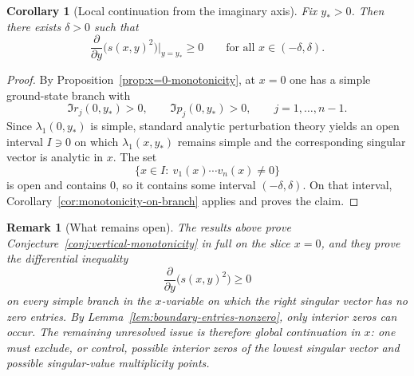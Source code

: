 \documentclass[11pt]{article}
\newtheorem{corollary}[theorem]{Corollary}
\newtheorem{remark}[theorem]{Remark}
\begin{document}
\begin{corollary}[Local continuation from the imaginary axis]\label{cor:local-continuation-from-x0}
Fix \(y_*>0\). Then there exists \(\delta>0\) such that
\[
\frac{\partial}{\partial y}\bigl(s(x,y)^2\bigr)\Big|_{y=y_*}\ge 0
\qquad
\text{for all }x\in(-\delta,\delta).
\]
\end{corollary}

\begin{proof}
By Proposition~\ref{prop:x=0-monotonicity}, at \(x=0\) one has a simple ground-state branch with
\[
\Im r_j(0,y_*)>0,
\qquad
\Im p_j(0,y_*)>0,
\qquad
j=1,\dots,n-1.
\]
Since \(\lambda_1(0,y_*)\) is simple, standard analytic perturbation theory yields an open interval \(I\ni 0\) on which \(\lambda_1(x,y_*)\) remains simple and the corresponding singular vector is analytic in \(x\). The set
\[
\{x\in I:\ v_1(x)\cdots v_n(x)\neq 0\}
\]
is open and contains \(0\), so it contains some interval \((-\delta,\delta)\). On that interval, Corollary~\ref{cor:monotonicity-on-branch} applies and proves the claim.
\end{proof}

\begin{remark}[What remains open]\label{rem:remaining-gap-monotonicity}
The results above prove Conjecture~\ref{conj:vertical-monotonicity} in full on the slice \(x=0\), and they prove the differential inequality
\[
\frac{\partial}{\partial y}\bigl(s(x,y)^2\bigr)\ge 0
\]
on every simple branch in the \(x\)-variable on which the right singular vector has no zero entries. By Lemma~\ref{lem:boundary-entries-nonzero}, only interior zeros can occur. The remaining unresolved issue is therefore global continuation in \(x\): one must exclude, or control, possible interior zeros of the lowest singular vector and possible singular-value multiplicity points.
\end{remark}
\end{document}
